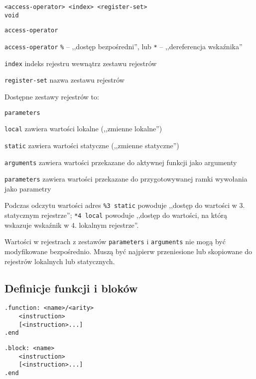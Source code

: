 \begin{lstlisting}
<access-operator> <index> <register-set>
void
\end{lstlisting}

\begin{labeling}{\texttt{access-operator}}
\item[\texttt{access-operator}] \texttt{\%} -- ,,dostęp bezpośredni'', lub
	\texttt{*} -- ,,dereferencja wskaźnika''
\item[\texttt{index}] indeks rejestru wewnątrz zestawu rejestrów
\item[\texttt{register-set}] nazwa zestawu rejestrów
\end{labeling}

Dostępne zestawy rejestrów to:

\begin{labeling}{\texttt{parameters}}
\item[\texttt{local}] zawiera wartości lokalne (,,zmienne lokalne'')
\item[\texttt{static}] zawiera wartości statyczne (,,zmienne statyczne'')
\item[\texttt{arguments}] zawiera wartości przekazane do aktywnej funkcji jako argumenty
\item[\texttt{parameters}] zawiera wartości przekazane do przygotowywanej ramki wywołania jako parametry
\end{labeling}

Podczas odczytu wartości adres \texttt{\%3 static} powoduje ,,dostęp do wartości w 3. statycznym rejestrze'';
\texttt{*4 local} powoduje ,,dostęp do wartości, na którą wskazuje wskaźnik w 4. lokalnym rejestrze''.

Wartości w rejestrach z zestawów \texttt{parameters} i \texttt{arguments} nie mogą być modyfikowane
bezpośrednio. Muszą być najpierw przeniesione lub skopiowane do rejestrów lokalnych lub statycznych.

\subsection{Definicje funkcji i bloków}

\begin{lstlisting}
.function: <name>/<arity>
	<instruction>
	[<instruction>...]
.end
\end{lstlisting}

\begin{lstlisting}
.block: <name>
	<instruction>
	[<instruction>...]
.end
\end{lstlisting}


